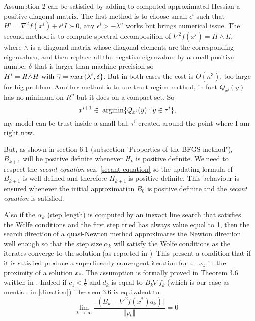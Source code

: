 Assumption 2 can be satisfied by adding to computed approximated Hessian a positive diagonal matrix.
The first method is to choose small $\epsilon^i$ such that $H^i=\nabla^2f(x^i) + \epsilon^iI\succ0$, any $\epsilon^i>-\lambda^n$ works but brings numerical issue. 
The second method is to compute spectral decomposition of $\nabla^2f(x^i)=H\wedge H$, where $\wedge$ is a diagonal matrix whose diagonal elements are the corresponding eigenvalues, and then replace all the negative eigenvalues by a small positive number $\delta$ that is larger than machine precision so $H^i=H\overline{\wedge}H \textnormal{ with } \overline{\gamma}=max\{\lambda^i,\delta\}$. But in both cases the cost is $O(n^3)$, too large for big problem. Another method is to use trust region method, in fact $Q_{x^i}(y)$ has no minimum on $R^n$ but it does on a compact set. So 
\begin{equation}
x^{i+1} \in \textnormal{ argmin}\{Q_{x^i}(y):y\in \tau^i\},
\end{equation}
my model can be trust inside a small ball $\tau^i$ created around the point where I am right now.

But, as shown in \cite{numerical} section 6.1 (subsection "Properties of the BFGS method"),  $B_{k+1}$ will be positive definite whenever $H_{k}$ is positive definite. We need to respect the \textit{secant equation} sez. \ref{secant-equation} so the updating formula of $B_{k+1}$ is well defined and therefore $H_{k+1}$ is positive definite. This behaviour 
is ensured whenever the initial approximation $B_{0}$ is positive definite and the \textit{secant equation} is satisfied. 

Also if the $\alpha_{k}$ (step length) is computed by an inexact line search that satisfies the Wolfe conditions and the first step tried has always value equal to 1, then the search direction of a quasi-Newton method approximates the Newton direction well enough so that the step size $\alpha_{k}$ will satisfy the Wolfe conditions as the iterates converge to the solution (as reported in \cite{numerical}). This present a condition that if it is satisfied produce a superlinearly convergent iteration for all $x_{k}$ in the proximity of a solution $x_{*}$. 
The assumption is formally proved in Theorem 3.6 written in \cite{numerical}. Indeed if $c_{1}<\frac{1}{2}$ and $d_{k}$ is equal to $B_{k}\nabla f_{k}$ (which is our case as mention in \ref{direction}) Theorem 3.6 is equivalent to: 
\begin{equation}
\label{L-BFGSConv}
 \lim_{k\to\infty}\frac{\Vert (B_{k} - \nabla^2f(x^*) d_{k})\Vert}{\Vert p_{k} \Vert} = 0.
\end{equation}

